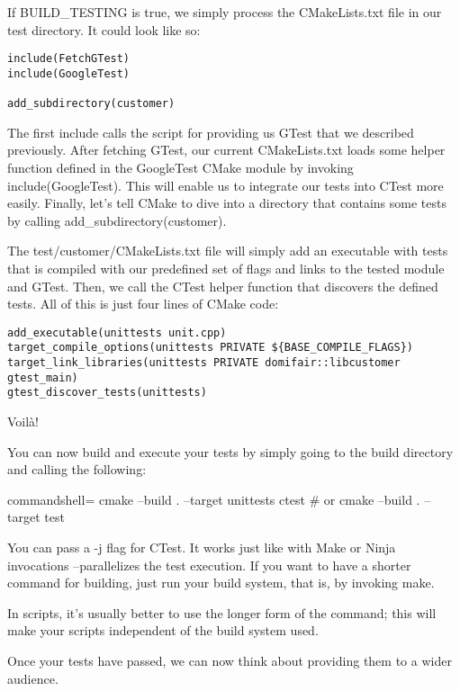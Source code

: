 If BUILD\_TESTING is true, we simply process the CMakeLists.txt file in our test directory. It could look like so:

\begin{lstlisting}[style=styleCMake]
include(FetchGTest)
include(GoogleTest)

add_subdirectory(customer)
\end{lstlisting}

The first include calls the script for providing us GTest that we described previously. After fetching GTest, our current CMakeLists.txt loads some helper function defined in the GoogleTest CMake module by invoking include(GoogleTest). This will enable us to integrate our tests into CTest more easily. Finally, let's  tell CMake to dive into a directory that contains some tests by calling  add\_subdirectory(customer).

The test/customer/CMakeLists.txt file will simply add an executable with tests that is compiled with our predefined set of flags and links to the tested module and GTest. Then, we call the CTest helper function that discovers the defined tests. All of this is just four lines of CMake code:

\begin{lstlisting}[style=styleCMake]
add_executable(unittests unit.cpp)
target_compile_options(unittests PRIVATE ${BASE_COMPILE_FLAGS})
target_link_libraries(unittests PRIVATE domifair::libcustomer gtest_main)
gtest_discover_tests(unittests)
\end{lstlisting}

Voilà!

You can now build and execute your tests by simply going to the build directory and calling the following:

\begin{tcblisting}{commandshell={}}
cmake --build . --target unittests
ctest # or cmake --build . --target test
\end{tcblisting}

You can pass a -j flag for CTest. It works just like with Make or Ninja invocations –parallelizes the test execution. If you want to have a shorter command for building, just run your build system, that is, by invoking make.

\begin{tcolorbox}[colback=blue!5!white,colframe=blue!75!black, title=Note]
\hspace*{0.7cm}In scripts, it's usually better to use the longer form of the command; this will make your scripts independent of the build system used.
\end{tcolorbox}

Once your tests have passed, we can now think about providing them to a wider audience.






